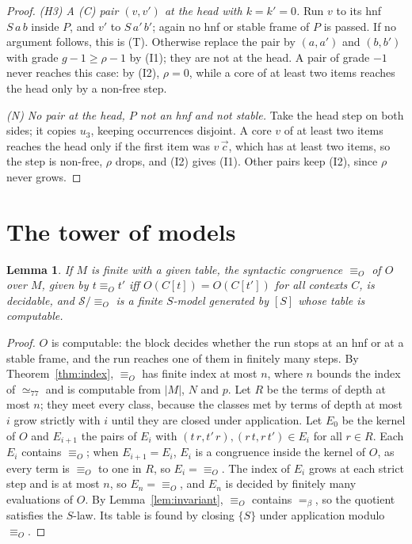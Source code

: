 \documentclass[11pt]{amsart}
\newtheorem{lemma}[theorem]{Lemma}
\theoremstyle{definition}
\newcommand{\Ter}{\mathcal S}
\newcommand{\conv}{=_\beta}
\begin{document}
\begin{proof}
\emph{(H3) A (C) pair $(v,v')$ at the head with $k=k'=0$.} Run $v$ to its hnf $S\,a\,b$ inside $P$, and
$v'$ to $S\,a'\,b'$; again no hnf or stable frame of $P$ is passed. If no argument follows, this is
(T). Otherwise replace the pair by $(a,a')$ and $(b,b')$ with grade $g-1\ge\rho-1$ by (I1); they are
not at the head. A pair of grade $-1$ never reaches this case: by (I2), $\rho=0$, while a core of at
least two items reaches the head only by a non-free step.

\emph{(N) No pair at the head, $P$ not an hnf and not stable.} Take the head step on both sides; it
copies $u_3$, keeping occurrences disjoint. A core $v$ of at least two items reaches the head only if
the first item was $v\,\vec c$, which has at least two items, so the step is non-free, $\rho$ drops,
and (I2) gives (I1). Other pairs keep (I2), since $\rho$ never grows.
\end{proof}

\section{The tower of models}

\begin{lemma}\label{lem:decide}
If $M$ is finite with a given table, the syntactic congruence $\equiv_O$ of $O$ over $M$, given by $t\equiv_O t'$ iff
$O(C[t])=O(C[t'])$ for all contexts $C$, is decidable, and $\Ter/{\equiv_O}$ is a finite $S$-model
generated by $[S]$ whose table is computable.
\end{lemma}

\begin{proof}
$O$ is computable: the block decides whether the run stops at an hnf or at a stable frame, and the run
reaches one of them in finitely many steps. By Theorem~\ref{thm:index}, $\equiv_O$ has finite index at most $n$, where $n$ bounds the
index of $\simeq_{77}$ and is computable from $|M|$, $N$ and $p$. Let $R$ be the terms of depth at
most $n$; they meet every class, because the classes met by terms of depth at most $i$ grow
strictly with $i$ until they are closed under application. Let $E_0$ be the kernel of $O$ and $E_{i+1}$ the pairs of $E_i$ with
$(t\,r,t'\,r),(r\,t,r\,t')\in E_i$ for all $r\in R$. Each $E_i$ contains $\equiv_O$; when $E_{i+1}=E_i$,
$E_i$ is a congruence inside the kernel of $O$, as every term is $\equiv_O$ to one in $R$, so
$E_i={\equiv_O}$. The index of $E_i$ grows at each strict step and is at most $n$, so $E_n={\equiv_O}$, and $E_n$
is decided by finitely many evaluations of $O$. By Lemma~\ref{lem:invariant}, $\equiv_O$ contains
$\conv$, so the quotient satisfies the $S$-law. Its table is found by closing $\{S\}$ under
application modulo $\equiv_O$.
\end{proof}
\end{document}
